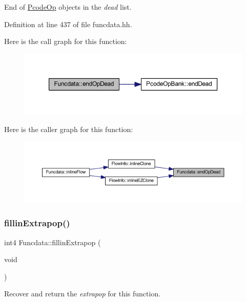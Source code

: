 End of \mbox{\hyperlink{class_pcode_op}{Pcode\+Op}} objects in the {\itshape dead} list. 



Definition at line 437 of file funcdata.\+hh.

Here is the call graph for this function\+:
\nopagebreak
\begin{figure}[H]
\begin{center}
\leavevmode
\includegraphics[width=350pt]{class_funcdata_a5974d38341f528cce4878658d11b4d0f_cgraph}
\end{center}
\end{figure}
Here is the caller graph for this function\+:
\nopagebreak
\begin{figure}[H]
\begin{center}
\leavevmode
\includegraphics[width=350pt]{class_funcdata_a5974d38341f528cce4878658d11b4d0f_icgraph}
\end{center}
\end{figure}
\mbox{\label{class_funcdata_a142938fffbfd5add2b6679a6b9b0d7fa}} 
\subsubsection{\texorpdfstring{fillinExtrapop()}{fillinExtrapop()}}
{\footnotesize\ttfamily int4 Funcdata\+::fillin\+Extrapop (\begin{DoxyParamCaption}\item[{void}]{ }\end{DoxyParamCaption})}



Recover and return the {\itshape extrapop} for this function. 

